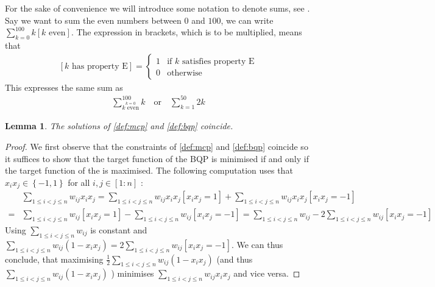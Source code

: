 \documentclass[12pt,a4paper]{article}
\theoremstyle{mythm}
\newtheorem{lem}[thm]{Lemma}
\begin{document}
For the sake of convenience we will introduce some notation to denote sums, see \cite[p. 41]{Aigner2007}. Say we want to sum the even numbers between $ 0 $ and $ 100 $, we can
write $ \sum_{ k = 0 }^{ 100 } k \left[ k \text{ even}  \right]  $. The expression in brackets, which is to be multiplied, means that 
\begin{align*}
\left[ k \text{ has property E}  \right] = 
\begin{cases}
1 & \text{if } k \text{ satisfies property E} \\
0 & \text{otherwise} 
\end{cases}
\end{align*} 
This expresses the same sum as 
\begin{align*}
\sum_{ \overset{ k = 0 }{ k \text{ even} }   }^{ 100 } k \quad \text{or} \quad \sum_{ k = 1 }^{ 50 } 2k
\end{align*} 
\begin{lem}
\label{lem:01}
The solutions of \ref{def:mcp} and \ref{def:bqp} coincide.
\end{lem} 
\begin{proof}
We first observe that the constraints of \ref{def:mcp} and \ref{def:bqp} coincide so it suffices to show that the target function of the BQP is minimised if and only if the
target function of the \MCP is maximised. The following computation uses that $ x_i x_j \in \left\{-1,1\right\}$ for all $ i,j \in \left[ 1 : n \right]  $ :
\begin{align*}
&\sum_{ 1 \leq i < j \leq n    }^{  } w _{ ij } x_i x_j 
= \sum_{  1 \leq i < j \leq n  }^{  } w _{ ij } x_i x_j \left[ x_i x_j = 1 \right]  + \sum_{ 1 \leq i < j \leq n    }^{  } w _{ ij } x_i x_j \left[ x_i x_j = -1\right] \\
=& \sum_{  1 \leq i < j \leq n  }^{  } w _{ ij } \left[ x_i x_j = 1 \right]  - \sum_{ 1 \leq i < j \leq n    }^{  } w _{ ij } \left[ x_i x_j = -1\right] 
= \sum_{  1 \leq i < j \leq n  }^{  } w _{ ij }   - 2\sum_{ 1 \leq i < j \leq n    }^{  } w _{ ij } \left[ x_i x_j = -1\right]
\end{align*} 
Using $ \sum_{ 1 \leq i < j \leq n    }^{  } w _{ ij }  $ is constant and $ \sum_{ 1 \leq i < j \leq n    }^{  } w _{ ij } (1 - x_i x_j) = 2 \sum_{ 1 \leq i < j \leq n    }^{  }
w _{ ij } \left[  x_i x_j = -1\right]  $. 
We can thus conclude, that maximising $ \frac{ 1 }{ 2 } \sum_{  1 \leq i < j \leq n   }^{  } w _{ ij } (1 - x_i x_j) $ (and thus $ \sum_{  1 \leq
i < j \leq n   }^{  } w _{ ij } (1 - x_i x_j) $ ) minimises $ \sum_{ 1 \leq i < j \leq n    }^{  } w _{ ij } x_i x_j $ and vice versa.
\end{proof}
\end{document}
